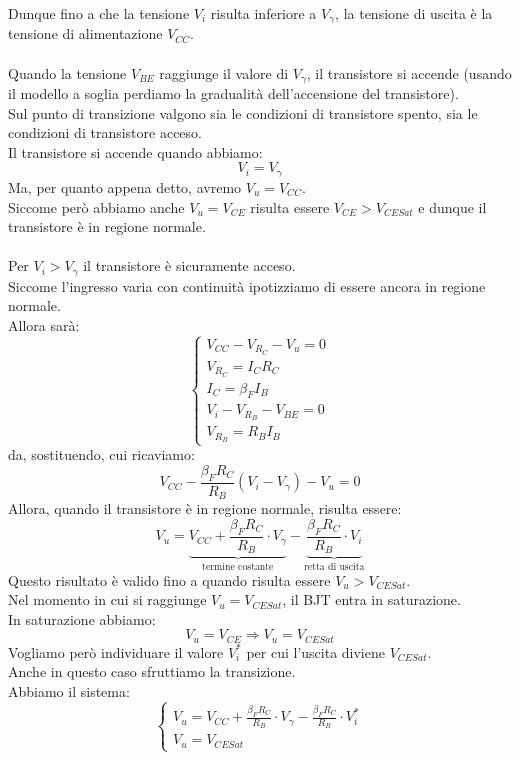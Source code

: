 \documentclass{article}
\numberwithin{equation}{subsection}
\begin{document}
	Dunque fino a che la tensione $V_i$ risulta inferiore a $V_\gamma$, la tensione di uscita è la tensione di alimentazione $V_{CC}$.\\\\
	Quando la tensione $V_{BE}$ raggiunge il valore di $V_\gamma$, il transistore si accende (usando il modello a soglia perdiamo la gradualità dell'accensione del transistore).\\
	Sul punto di transizione valgono sia le condizioni di transistore spento, sia le condizioni di transistore acceso.\\
	Il transistore si accende quando abbiamo:
	$$V_i = V_\gamma$$
	Ma, per quanto appena detto, avremo $V_u = V_{CC}$.\\
	Siccome però abbiamo anche $V_u = V_{CE}$ risulta essere $V_{CE} > V_{CESat}$ e dunque il transistore è in regione normale.\\\\
	Per $V_i > V_\gamma$ il transistore è sicuramente acceso.\\
	Siccome l'ingresso varia con continuità ipotizziamo di essere ancora in regione normale.\\
	Allora sarà:
	$$\begin{cases} V_{CC} - V_{R_C} - V_u = 0 \\ V_{R_C} = I_C R_C \\ I_C = \beta_F I_B \\ V_i - V_{R_B} - V_{BE} = 0 \\ V_{R_B} = R_B I_B \end{cases}$$
	da, sostituendo, cui ricaviamo:
	$$V_{CC} - \frac{\beta_F R_C}{R_B} (V_i - V_\gamma) - V_u = 0$$
	Allora, quando il transistore è in regione normale, risulta essere:
	$$V_u = \underbrace{V_{CC} + \frac{\beta_F R_C}{R_B} \cdot V_\gamma}_{\text{termine costante}} - \underbrace{\frac{\beta_F R_C}{R_B} \cdot V_i}_{\text{retta di uscita}}$$
	Questo risultato è valido fino a quando risulta essere $V_u > V_{CESat}$.\\
	Nel momento in cui si raggiunge $V_u = V_{CESat}$, il BJT entra in saturazione.\\
	In saturazione abbiamo:
	$$V_u = V_{CE} \Longrightarrow V_u = V_{CESat}$$
	Vogliamo però individuare il valore $V_i^*$ per cui l'uscita diviene $V_{CESat}$.\\
	Anche in questo caso sfruttiamo la transizione.\\
	Abbiamo il sistema:
	$$\begin{cases} V_u = V_{CC} + \frac{\beta_F R_C}{R_B} \cdot V_\gamma - \frac{\beta_F R_C}{R_B} \cdot V_i^* \\ V_u = V_{CESat} \end{cases}$$
\end{document}
